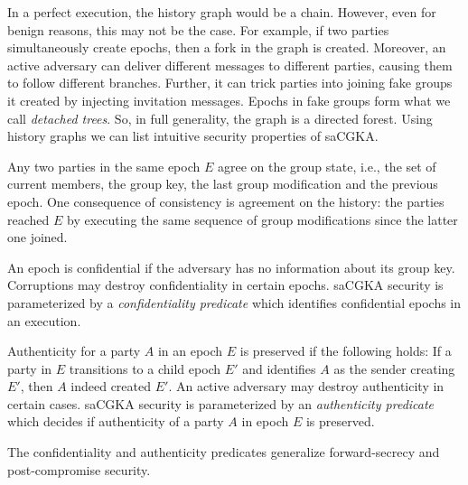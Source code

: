 In a perfect execution, the history graph would be a chain. However, even for
benign reasons, this may not be the case. For example, if two parties
simultaneously create epochs, then a fork in the graph is created. Moreover,
an active adversary can deliver different messages to different parties,
causing them to follow different branches. Further, it can trick parties into
joining fake groups it created by injecting invitation messages. Epochs in
fake groups form what we call \emph{detached trees}. So, in full generality,
the graph is a directed forest.
%
Using history graphs we can list intuitive security properties of saCGKA.
\begin{description}[itemsep=2pt,topsep=2pt,parsep=2pt]
  \item[Consistency] Any two parties in the same epoch $E$ agree on the group state, i.e., the set of current members, the group key, the last group modification and the previous epoch. One consequence of consistency is agreement on the history: the parties reached $E$ by executing the same sequence of group modifications since the latter one joined.
  \item[Confidentiality] An epoch is confidential if the adversary has no information about its group key. Corruptions may destroy confidentiality in certain epochs. saCGKA security is parameterized by a \emph{confidentiality predicate} which identifies confidential epochs in an execution.
  \item[Authenticity] Authenticity for a party $A$ in an epoch $E$ is preserved if the following holds: If a party in $E$ transitions to a child epoch $E'$ and identifies $A$ as the sender creating $E'$, then $A$ indeed created $E'$. An active adversary may destroy authenticity in certain cases. saCGKA security is parameterized by an \emph{authenticity predicate} which decides if authenticity of a party $A$ in epoch $E$ is preserved.
\end{description}
The confidentiality and authenticity predicates %
generalize forward-secrecy and post-compromise security.

